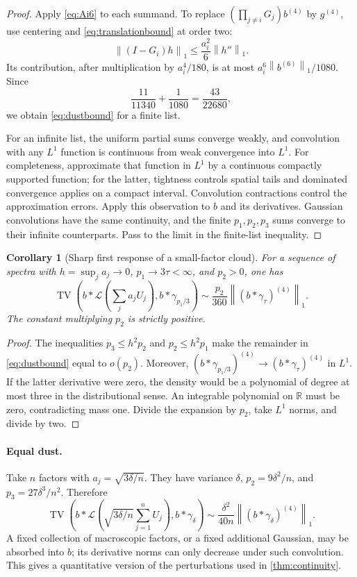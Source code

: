 \documentclass[11pt,letterpaper]{article}
\numberwithin{equation}{section}
\newtheorem{corollary}[theorem]{Corollary}
\theoremstyle{definition}
\theoremstyle{remark}
\newcommand{\R}{\mathbb R}
\newcommand{\TV}{\operatorname{TV}}
\newcommand{\Law}{\mathcal L}
\newcommand{\norm}[1]{\left\lVert#1\right\rVert}
\begin{document}
\begin{proof}
Apply \eqref{eq:Ai6} to each summand. To replace
$\left(\prod_{j\ne i}G_j\right)b^{(4)}$ by $g^{(4)}$, use centering and
\eqref{eq:translationbound} at order two:
\[
 \norm{(I-G_i)h}_1\le\frac{a_i^2}{6}\norm{h''}_1.
\]
Its contribution, after multiplication by $a_i^4/180$, is at most
$a_i^6\norm{b^{(6)}}_1/1080$. Since
\[
 \frac{11}{11340}+\frac1{1080}=\frac{43}{22680},
\]
we obtain \eqref{eq:dustbound} for a finite list.

For an infinite list, the uniform partial sums converge weakly, and convolution
with any $L^1$ function is continuous from weak convergence into $L^1$.
For completeness, approximate that function in $L^1$ by a continuous
compactly supported function; for the latter, tightness controls spatial tails
and dominated convergence applies on a compact interval. Convolution
contractions control the approximation errors. Apply this observation to
$b$ and its derivatives. Gaussian convolutions have the same continuity,
and the finite $p_1,p_2,p_3$ sums converge to their infinite counterparts.
Pass to the limit in the finite-list inequality.
\end{proof}

\begin{corollary}[Sharp first response of a small-factor cloud]
\label{cor:dust}
For a sequence of spectra with $h=\sup_j a_j\to0$,
$p_1\to3\tau<\infty$, and $p_2>0$, one has
\begin{equation}
 \TV\left(b*\Law\left(\sum_j a_jU_j\right),
               b*\gamma_{p_1/3}\right)
 \sim\frac{p_2}{360}\norm{(b*\gamma_\tau)^{(4)}}_1.
 \label{eq:dustasymptotic}
\end{equation}
The constant multiplying $p_2$ is strictly positive.
\end{corollary}
\begin{proof}
The inequalities $p_3\le h^2p_2$ and $p_2\le h^2p_1$ make the remainder in
\eqref{eq:dustbound} equal to $o(p_2)$. Moreover,
$(b*\gamma_{p_1/3})^{(4)}\to(b*\gamma_\tau)^{(4)}$ in $L^1$.
If the latter derivative were zero, the density would be a polynomial of
degree at most three in the distributional sense. An integrable polynomial
on $\R$ must be zero, contradicting mass one. Divide the expansion by $p_2$,
take $L^1$ norms, and divide by two.
\end{proof}

\paragraph{Equal dust.}
Take $n$ factors with $a_j=\sqrt{3\delta/n}$. They have variance $\delta$,
$p_2=9\delta^2/n$, and $p_3=27\delta^3/n^2$. Therefore
\begin{equation}
 \TV\left(b*\Law\left(\sqrt{3\delta/n}\sum_{j=1}^n U_j\right),
               b*\gamma_\delta\right)
 \sim\frac{\delta^2}{40n}\norm{(b*\gamma_\delta)^{(4)}}_1.
 \label{eq:equaldust}
\end{equation}
A fixed collection of macroscopic factors, or a fixed additional Gaussian,
may be absorbed into $b$; its derivative norms can only decrease under such
convolution. This gives a quantitative version of the perturbations used in
\cref{thm:continuity}.
\end{document}
